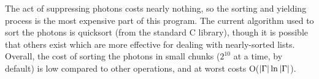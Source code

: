 The act of suppressing photons costs nearly nothing, so the sorting and yielding process is the most expensive part of this program. The current algorithm used to sort the photons is quicksort (from the standard C library), though it is possible that others exist which are more effective for dealing with nearly-sorted lists. Overall, the cost of sorting the photons in small chunks ($2^{10}$ at a time, by default) is low compared to other operations, and at worst costs O($\left|\Gamma\right|\ln{\ensuremath{\left|\Gamma\right|}}$).
